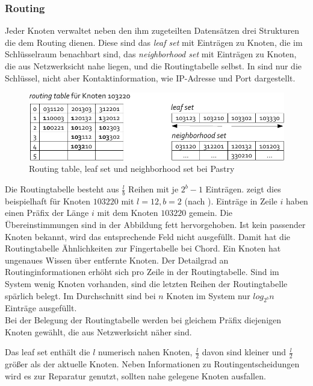 \subsubsection{Routing}
Jeder Knoten verwaltet neben den ihm zugeteilten Datensätzen drei Strukturen die dem Routing dienen. Diese sind das \emph{leaf set} mit Einträgen zu Knoten, die im Schlüsselraum benachbart sind, das \emph{neighborhood set} mit Einträgen zu Knoten, die aus Netzwerksicht nahe liegen, und die Routingtabelle selbst. In  sind nur die Schlüssel, nicht aber Kontaktinformation, wie IP-Adresse und Port dargestellt.

\begin{figure}[htbp]
\centering
\includegraphics{grafics/pastry_routing_table.pdf}
\caption{Routing table, leaf set und neighborhood set bei Pastry}
\label{fig:pastry_routing_table}
\end{figure}

Die Routingtabelle besteht aus $\frac{l}{b}$ Reihen mit je $2^b -1$ Einträgen.  zeigt dies beispielhaft für Knoten $103220$ mit $l=12, b=2$ (nach \cite{Goetz2005}). Einträge in Zeile $i$ haben einen Präfix der Länge $i$ mit dem Knoten $103220$ gemein. Die Übereinstimmungen sind in der Abbildung fett hervorgehoben. Ist kein passender Knoten bekannt, wird das entsprechende Feld nicht ausgefüllt. Damit hat die Routingtabelle Ähnlichkeiten zur Fingertabelle bei Chord. Ein Knoten hat ungenaues Wissen über entfernte Knoten. Der Detailgrad an Routinginformationen erhöht sich pro Zeile in der Routingtabelle. Sind im System wenig Knoten vorhanden, sind die letzten Reihen der Routingtabelle spärlich belegt. Im Durchschnitt sind bei $n$ Knoten im System nur $log_{2^b} n$ Einträge ausgefüllt.\\
Bei der Belegung der Routingtabelle werden bei gleichem Präfix diejenigen Knoten gewählt, die aus Netzwerksicht näher sind.

Das leaf set enthält die $l$ numerisch nahen Knoten, $\frac{l}{2}$ davon sind kleiner und $\frac{l}{2}$ größer als der aktuelle Knoten. Neben Informationen zu Routingentscheidungen wird es zur Reparatur genutzt, sollten nahe gelegene Knoten ausfallen.

